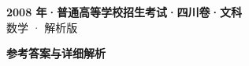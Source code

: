 \documentclass[zihao=-4, a4paper]{ctexart}
\begin{document}
\begin{center}
  {\Large\bfseries 2008 年·普通高等学校招生考试·四川卷·文科}\\[4pt]
  {\large 数学 · 解析版}
\end{center}
\medskip
{}

\clearpage
{}
\begin{center}{\Large\bfseries 参考答案与详细解析}\end{center}
\medskip

\end{document}
